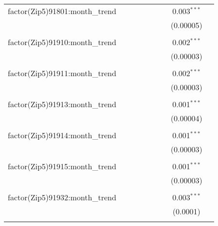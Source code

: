 \begin{table}[H]
{\begin{tabular}{@{\extracolsep{5pt}}lcccccccc}
  factor(Zip5)91801:month\_trend &  &  &  &  &  &  & 0.003$^{***}$ &  \\  

   &  &  &  &  &  &  & (0.00005) &  \\  

   & & & & & & & & \\  

  factor(Zip5)91910:month\_trend &  &  &  &  &  &  & 0.002$^{***}$ &  \\  

   &  &  &  &  &  &  & (0.00003) &  \\  

   & & & & & & & & \\  

  factor(Zip5)91911:month\_trend &  &  &  &  &  &  & 0.002$^{***}$ &  \\  

   &  &  &  &  &  &  & (0.00003) &  \\  

   & & & & & & & & \\  

  factor(Zip5)91913:month\_trend &  &  &  &  &  &  & 0.001$^{***}$ &  \\  

   &  &  &  &  &  &  & (0.00004) &  \\  

   & & & & & & & & \\  

  factor(Zip5)91914:month\_trend &  &  &  &  &  &  & 0.001$^{***}$ &  \\  

   &  &  &  &  &  &  & (0.00003) &  \\  

   & & & & & & & & \\  

  factor(Zip5)91915:month\_trend &  &  &  &  &  &  & 0.001$^{***}$ &  \\  

   &  &  &  &  &  &  & (0.00003) &  \\  

   & & & & & & & & \\  

  factor(Zip5)91932:month\_trend &  &  &  &  &  &  & 0.003$^{***}$ &  \\  

   &  &  &  &  &  &  & (0.0001) &  \\  

   & & & & & & & & \\  


\end{tabular}}
\end{table}
